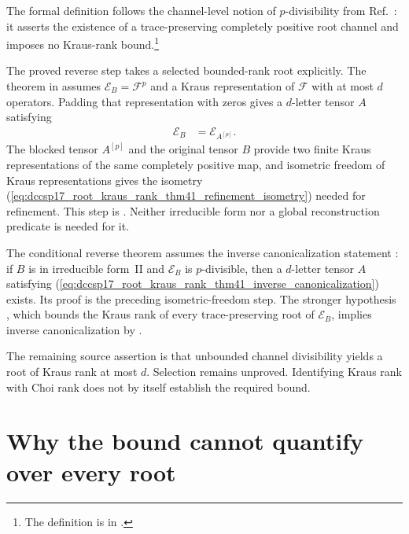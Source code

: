 \documentclass{article}
\begin{document}
The formal definition follows the channel-level notion of $p$-divisibility
from Ref.~\cite{DeLasCuevas2017Irreducible}: it asserts the existence of a
trace-preserving completely positive root channel and imposes no Kraus-rank
bound.\footnote{The definition is
 in
.}

The proved reverse step takes a selected bounded-rank root explicitly. The
theorem  in
assumes $\mathcal E_B=\mathcal F^p$ and a Kraus representation of
$\mathcal F$ with at most $d$ operators. Padding that representation with
zeros gives a $d$-letter tensor $A$ satisfying
\begin{align}
    \mathcal E_B&=\mathcal E_{A^{[p]}}.
    \label{eq:dccsp17_root_kraus_rank_thm41_inverse_canonicalization}
\end{align}
The blocked tensor $A^{[p]}$ and the original tensor $B$ provide two finite
Kraus representations of the same completely positive map, and isometric
freedom of Kraus representations gives the isometry
(\ref{eq:dccsp17_root_kraus_rank_thm41_refinement_isometry}) needed for
refinement. This step is
. Neither
irreducible form nor a global reconstruction predicate is needed for it.

The conditional reverse theorem
 assumes the inverse
canonicalization statement :
if $B$ is in irreducible form~II and $\mathcal E_B$ is $p$-divisible, then a
$d$-letter tensor $A$ satisfying
(\ref{eq:dccsp17_root_kraus_rank_thm41_inverse_canonicalization}) exists. Its
proof is the preceding isometric-freedom step. The stronger hypothesis
, which bounds the Kraus
rank of every trace-preserving root of $\mathcal E_B$, implies inverse
canonicalization by
.

The remaining source assertion is that unbounded channel divisibility yields
a root of Kraus rank at most $d$. Selection remains unproved. Identifying
Kraus rank with Choi rank does not by itself establish the required bound.

\section{Why the bound cannot quantify over every root}
\end{document}
